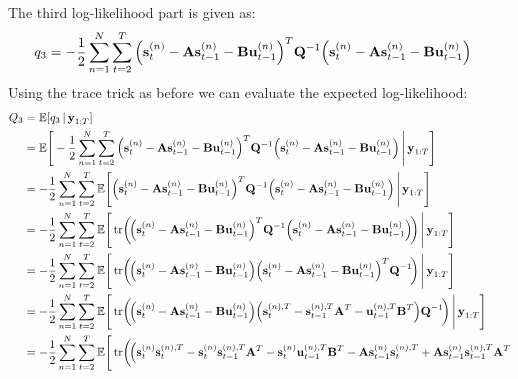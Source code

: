 		The third log-likelihood part is given as:
		\begin{align*}
			q_3 &= -\frac{1}{2} \sum_{n = 1}^{N} \sum_{t = 2}^{T} \Big(\boldsymbol{\mathrm{s}}_t^{(n)} - \boldsymbol{\mathrm{A}} \boldsymbol{\mathrm{s}}_{t - 1}^{(n)} - \boldsymbol{\mathrm{B}} \boldsymbol{\mathrm{u}}_{t - 1}^{(n)}\Big)^T \boldsymbol{\mathrm{Q}}^{-1} \Big(\boldsymbol{\mathrm{s}}_t^{(n)} - \boldsymbol{\mathrm{A}} \boldsymbol{\mathrm{s}}_{t - 1}^{(n)} - \boldsymbol{\mathrm{B}} \boldsymbol{\mathrm{u}}_{t - 1}^{(n)}\Big)
		\end{align*}
		Using the trace trick as before we can evaluate the expected log-likelihood:
		\begin{align*}
			Q_3
				&= \E[q_3 \given \vec{y}_{1:T}] \\
				&= \E\Bigg[ -\frac{1}{2} \sum_{n = 1}^{N} \sum_{t = 2}^{T} \Big(\vec{s}_t^{(n)} - \mat{A} \vec{s}_{t - 1}^{(n)} - \mat{B} \vec{u}_{t - 1}^{(n)}\Big)^T \mat{Q}^{-1} \Big(\vec{s}_t^{(n)} - \mat{A} \vec{s}_{t - 1}^{(n)} - \mat{B} \vec{u}_{t - 1}^{(n)}\Big) \Bigggiven \vec{y}_{1:T} \Bigg] \\
				&= -\frac{1}{2} \sum_{n = 1}^{N} \sum_{t = 2}^{T} \E\Bigg[ \Big(\vec{s}_t^{(n)} - \mat{A} \vec{s}_{t - 1}^{(n)} - \mat{B} \vec{u}_{t - 1}^{(n)}\Big)^T \mat{Q}^{-1} \Big(\vec{s}_t^{(n)} - \mat{A} \vec{s}_{t - 1}^{(n)} - \mat{B} \vec{u}_{t - 1}^{(n)}\Big) \Bigggiven \vec{y}_{1:T} \Bigg] \\
				&= -\frac{1}{2} \sum_{n = 1}^{N} \sum_{t = 2}^{T} \E\Bigg[ \tr\!\bigg(\! \Big(\vec{s}_t^{(n)} - \mat{A} \vec{s}_{t - 1}^{(n)} - \mat{B} \vec{u}_{t - 1}^{(n)}\Big)^T \mat{Q}^{-1} \Big(\vec{s}_t^{(n)} - \mat{A} \vec{s}_{t - 1}^{(n)} - \mat{B} \vec{u}_{t - 1}^{(n)}\Big) \!\bigg) \Bigggiven \vec{y}_{1:T} \Bigg] \\
				&= -\frac{1}{2} \sum_{n = 1}^{N} \sum_{t = 2}^{T} \E\Bigg[ \tr\!\bigg(\! \Big(\vec{s}_t^{(n)} - \mat{A} \vec{s}_{t - 1}^{(n)} - \mat{B} \vec{u}_{t - 1}^{(n)}\Big) \Big(\vec{s}_t^{(n)} - \mat{A} \vec{s}_{t - 1}^{(n)} - \mat{B} \vec{u}_{t - 1}^{(n)}\Big)^T \mat{Q}^{-1} \!\bigg) \Bigggiven \vec{y}_{1:T} \Bigg] \\
				&= -\frac{1}{2} \sum_{n = 1}^{N} \sum_{t = 2}^{T} \E\Bigg[ \tr\!\bigg(\! \Big(\vec{s}_t^{(n)} - \mat{A} \vec{s}_{t - 1}^{(n)} - \mat{B} \vec{u}_{t - 1}^{(n)}\Big) \Big(\vec{s}_t^{(n), T} - \vec{s}_{t - 1}^{(n), T} \mat{A}^T - \vec{u}_{t - 1}^{(n), T} \mat{B}^T\Big) \mat{Q}^{-1} \!\bigg) \Bigggiven \vec{y}_{1:T} \Bigg] \\
				&= -\frac{1}{2} \sum_{n = 1}^{N} \sum_{t = 2}^{T} \E\Bigg[ \tr\!\bigg(\! \Big(\vec{s}_t^{(n)} \vec{s}_t^{(n), T} - \vec{s}_t^{(n)} \vec{s}_{t - 1}^{(n), T} \mat{A}^T - \vec{s}_t^{(n)} \vec{u}_{t - 1}^{(n), T} \mat{B}^T - \mat{A} \vec{s}_{t - 1}^{(n)} \vec{s}_t^{(n), T} + \mat{A} \vec{s}_{t - 1}^{(n)} \vec{s}_{t - 1}^{(n), T} \mat{A}^T \\

\end{align*}
